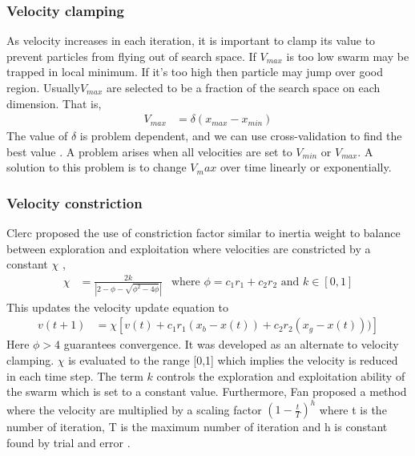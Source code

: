 \documentclass{article}
\begin{document}
\subsubsection{Velocity clamping}
As velocity increases in each iteration, it is important to clamp its value to prevent particles from flying out of search space. If $V_{max}$ is too low swarm may be trapped in local minimum. If it's too high then particle may jump over good region. Usually$V_{max}$ are selected to be a fraction of the search space on each dimension. That is,
\begin{align*}
    V_{max} &=  \delta(x_{max} - x_{min})
\end{align*}
The value of $\delta$ is problem dependent, and we can use cross-validation to find the best value \cite{omran2004image}. A problem arises when all velocities are set to $V_{min}$ or $V_{max}$. A solution to this problem is to change $V_max$ over time linearly or exponentially.




\subsubsection{Velocity constriction}
Clerc  proposed the use of constriction factor similar to inertia weight to balance between exploration and exploitation where velocities are constricted by a constant $\chi$ \cite{clerc1999swarm},
\begin{align*}
\chi &= \frac{2k}{|2-\phi - \sqrt{\phi^2 - 4\phi}|} & \text{where } \phi = c_1 r_1 + c_2 r_2 \text{ and } k \in [0,1]
\end{align*}
This updates the velocity update equation to 
\begin{align*}v(t+1) &= \chi[v(t) + c_1r_1(x_b - x(t)) + c_2r_2(x_g - x(t)))]\end{align*}
Here $\phi > 4$  guarantees convergence. It was developed as an alternate to velocity clamping. $\chi$ is evaluated to the range [0,1] which implies the velocity is reduced in each time step. The term $k$ controls the exploration and exploitation ability of the swarm which is set to a constant value. Furthermore, Fan proposed a method where the velocity are multiplied by a scaling factor $(1 - \frac{t}{T})^h$ where t is the number of iteration, T is the maximum number of iteration and h is constant found by trial and error \cite{fan2002modification}.
\end{document}
